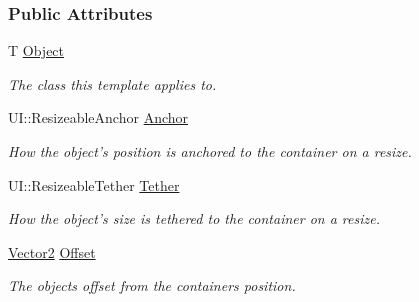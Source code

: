 \subsubsection*{Public Attributes}
\begin{DoxyCompactItemize}
\item 
\hypertarget{structphys_1_1UI_1_1ResizingInfo_a2f925cf9136fdba5612d9ba741201dc2}{
T \hyperlink{structphys_1_1UI_1_1ResizingInfo_a2f925cf9136fdba5612d9ba741201dc2}{Object}}
\label{d0/d08/structphys_1_1UI_1_1ResizingInfo_a2f925cf9136fdba5612d9ba741201dc2}

\begin{DoxyCompactList}\small\item\em The class this template applies to. \item\end{DoxyCompactList}\item 
\hypertarget{structphys_1_1UI_1_1ResizingInfo_a2164abb4b82f0b7d26d13a13cc480010}{
UI::ResizeableAnchor \hyperlink{structphys_1_1UI_1_1ResizingInfo_a2164abb4b82f0b7d26d13a13cc480010}{Anchor}}
\label{d0/d08/structphys_1_1UI_1_1ResizingInfo_a2164abb4b82f0b7d26d13a13cc480010}

\begin{DoxyCompactList}\small\item\em How the object's position is anchored to the container on a resize. \item\end{DoxyCompactList}\item 
\hypertarget{structphys_1_1UI_1_1ResizingInfo_ab38a235a394d8c3bf3e15f331e94ae3b}{
UI::ResizeableTether \hyperlink{structphys_1_1UI_1_1ResizingInfo_ab38a235a394d8c3bf3e15f331e94ae3b}{Tether}}
\label{d0/d08/structphys_1_1UI_1_1ResizingInfo_ab38a235a394d8c3bf3e15f331e94ae3b}

\begin{DoxyCompactList}\small\item\em How the object's size is tethered to the container on a resize. \item\end{DoxyCompactList}\item 
\hypertarget{structphys_1_1UI_1_1ResizingInfo_ab9dbc0f04f78ff0081b54e461a37a75e}{
\hyperlink{classphys_1_1Vector2}{Vector2} \hyperlink{structphys_1_1UI_1_1ResizingInfo_ab9dbc0f04f78ff0081b54e461a37a75e}{Offset}}
\label{d0/d08/structphys_1_1UI_1_1ResizingInfo_ab9dbc0f04f78ff0081b54e461a37a75e}

\begin{DoxyCompactList}\small\item\em The objects offset from the containers position. \item\end{DoxyCompactList}\end{DoxyCompactItemize}


